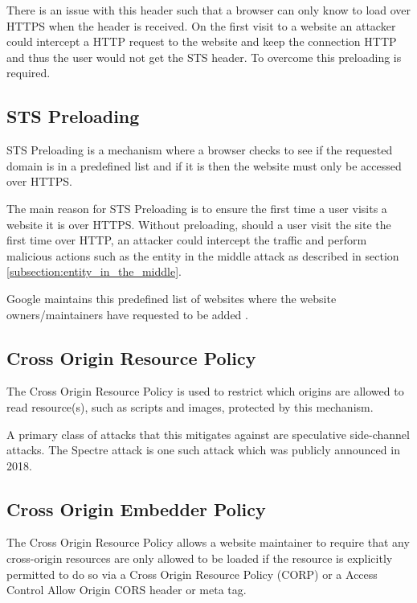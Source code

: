 \documentclass{mscreport}
\begin{document}
\vspace{0.3cm} \noindent
There is an issue with this header such that a browser can only know to load over HTTPS when the header is received. On the first visit to a website an attacker could intercept a HTTP request to the website and keep the connection HTTP and thus the user would not get the STS header. To overcome this preloading is required.


\subsection{STS Preloading}
STS Preloading is a mechanism where a browser checks to see if the requested domain is in a predefined list and if it is then the website must only be accessed over HTTPS.

\vspace{0.3cm} \noindent
The main reason for STS Preloading is to ensure the first time a user visits a website it is over HTTPS. Without preloading, should a user visit the site the first time over HTTP, an attacker could intercept the traffic and perform malicious actions such as the entity in the middle attack as described in section \ref{subsection:entity_in_the_middle}.

\vspace{0.3cm} \noindent
Google maintains this predefined list of websites where the website owners/maintainers have requested to be added \cite{Hodges2012-pe}.


\subsection{Cross Origin Resource Policy}
The Cross Origin Resource Policy is used to restrict which origins are allowed to read resource(s), such as scripts and images, protected by this mechanism.

\vspace{0.3cm} \noindent
A primary class of attacks that this mitigates against are speculative side-channel attacks. The Spectre attack \cite{Kocher2019-gv} is one such attack which was publicly announced in 2018.


\subsection{Cross Origin Embedder Policy}
The Cross Origin Resource Policy allows a website maintainer to require that any cross-origin resources are only allowed to be loaded if the resource is explicitly permitted to do so via a Cross Origin Resource Policy (CORP) or a Access Control Allow Origin CORS header or meta tag.
\end{document}
